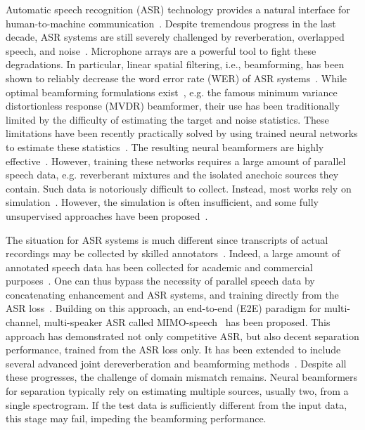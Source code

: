 \documentclass[a4paper]{article}
\begin{document}
%
Automatic speech recognition (ASR) technology provides a natural interface for human-to-machine communication~\cite{yuAutomaticSpeechRecognition2015}.
Despite tremendous progress in the last decade, ASR systems are still severely challenged by reverberation, overlapped speech, and noise~\cite{haeb-umbachFarFieldAutomaticSpeech2021}.
Microphone arrays are a powerful tool to fight these degradations.
In particular, linear spatial filtering, i.e., beamforming, has been shown to reliably decrease the word error rate (WER) of ASR systems~\cite{haeb-umbachFarFieldAutomaticSpeech2021}.
While optimal beamforming formulations exist~\cite{VanTrees_optimum_2002}, e.g. the famous minimum variance distortionless response (MVDR) beamformer, their use has been traditionally limited by the difficulty of estimating the target and noise statistics.
These limitations have been recently practically solved by using trained neural networks to estimate these statistics~\cite{erdoganImprovedMVDRBeamforming2016}.
The resulting neural beamformers are highly effective~\cite{heymannNeuralNetworkBased2016}.
However, training these networks requires a large amount of parallel speech data, e.g. reverberant mixtures and the isolated anechoic sources they contain.
Such data is notoriously difficult to collect.
Instead, most works rely on simulation~\cite{habetsGeneratingNonstationary2008,Scheibler:2018di}.
However, the simulation is often insufficient, and some fully unsupervised approaches have been proposed~\cite{drudeUnsupervisedTrainingDeep2019,togamiUnsupervisedTrainingDeep2020}.

The situation for ASR systems is much different since transcripts of actual recordings may be collected by skilled annotators~\cite{yuAutomaticSpeechRecognition2015}.
Indeed, a large amount of annotated speech data has been collected for academic and commercial purposes~\cite{pratapMLSLargeScaleMultilingual2020}.
One can thus bypass the necessity of parallel speech data by concatenating enhancement and ASR systems, and training directly from the ASR loss~\cite{heymannBeamnetEndtoendTraining2017,Unified-Ochiai2017}.
Building on this approach, an end-to-end (E2E) paradigm for multi-channel, multi-speaker ASR called MIMO-speech~\cite{changMIMOSpeechEndtoendMultichannel2019} has been proposed.
This approach has demonstrated not only competitive ASR, but also decent separation performance, trained from the ASR loss only.
It has been extended to include several advanced joint dereverberation and beamforming methods~\cite{zhangEndtoEndFarFieldSpeech2020,zhangEndtoEndDereverberationBeamforming2021}.
Despite all these progresses, the challenge of domain mismatch remains.
Neural beamformers for separation typically rely on estimating multiple sources, usually two, from a single spectrogram.
If the test data is sufficiently different from the input data, this stage may fail, impeding the beamforming performance.
\end{document}
